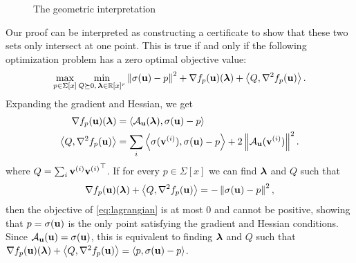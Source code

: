 \documentclass[final,onefignum,onetabnum]{siamart220329}
\begin{document}
\begin{figure}[ht]
  \centering
  \def\svgwidth{\columnwidth/2}
  
  \caption{\label{fig:geometric} The geometric interpretation}
\end{figure}

Our proof can be interpreted as constructing a certificate to show that these
two sets only intersect at one point. This is true if and only if the following
optimization problem has a zero optimal objective value:
\begin{align} \label{eq:lagrangian}
  \max_{p \in \Sigma[x]} \min_{Q \succeq 0,\, \boldsymbol{\mathbf{\lambda}} \in \mathbb{R}[x]^r}
  \left\lVert \sigma(\boldsymbol{\mathbf{u}}) - p \right\lVert^2 + \nabla f_p(\boldsymbol{\mathbf{u}})(\boldsymbol{\mathbf{\lambda}})
  + \left\langle Q, \nabla^2 f_p(\boldsymbol{\mathbf{u}}) \right\rangle.
\end{align}
Expanding the gradient and Hessian, we get
\begin{align*}
  \nabla f_p(\boldsymbol{\mathbf{u}})(\boldsymbol{\mathbf{\lambda}}) &= \left\langle \mathcal{A}_{\boldsymbol{\mathbf{u}}}(\boldsymbol{\mathbf{\lambda}}), \sigma(\boldsymbol{\mathbf{u}}) - p \right\rangle \\
  \left\langle Q, \nabla^2 f_p(\boldsymbol{\mathbf{u}}) \right\rangle &= \sum_i \left\langle \sigma(\boldsymbol{\mathbf{v}}^{(i)}), \sigma(\boldsymbol{\mathbf{u}}) - p \right\rangle
                                     + 2 \left\lVert \mathcal{A}_{\boldsymbol{\mathbf{u}}}(\boldsymbol{\mathbf{v}}^{(i)}) \right\lVert^2.
\end{align*}
where $Q = \sum_i \boldsymbol{\mathbf{v}}^{(i)} {\boldsymbol{\mathbf{v}}^{(i)}}^\top$. If for every
$p \in \Sigma[x]$ we can find $\boldsymbol{\mathbf{\lambda}}$ and $Q$ such that
\begin{align}
  \label{eq:lambdaQ}
  \nabla f_p(\boldsymbol{\mathbf{u}})(\boldsymbol{\mathbf{\lambda}}) + \left\langle Q, \nabla^2 f_p(\boldsymbol{\mathbf{u}}) \right\rangle
  = -\left\lVert \sigma(\boldsymbol{\mathbf{u}}) - p \right\lVert^2,
\end{align}
then the objective of \eqref{eq:lagrangian} is at most 0 and cannot be positive,
showing that $p = \sigma(\boldsymbol{\mathbf{u}})$ is the only point satisfying the gradient
and Hessian conditions. Since $\mathcal{A}_{\boldsymbol{\mathbf{u}}}(\boldsymbol{\mathbf{u}}) = \sigma(\boldsymbol{\mathbf{u}})$, this is
equivalent to finding $\boldsymbol{\mathbf{\lambda}}$ and $Q$ such that
$\nabla f_p(\boldsymbol{\mathbf{u}})(\boldsymbol{\mathbf{\lambda}}) + \left\langle Q, \nabla^2 f_p(\boldsymbol{\mathbf{u}}) \right\rangle =
\left\langle p, \sigma(\boldsymbol{\mathbf{u}}) - p \right\rangle$.
\end{document}
